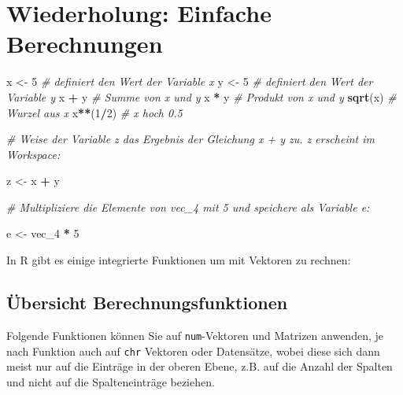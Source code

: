 \documentclass[
  ngerman,
]{book}
\newenvironment{Shaded}{\begin{snugshade}}{\end{snugshade}}
\newcommand{\CommentTok}[1]{\textcolor[rgb]{0.56,0.35,0.01}{\textit{#1}}}
\newcommand{\DecValTok}[1]{\textcolor[rgb]{0.00,0.00,0.81}{#1}}
\newcommand{\FunctionTok}[1]{\textcolor[rgb]{0.13,0.29,0.53}{\textbf{#1}}}
\newcommand{\NormalTok}[1]{#1}
\newcommand{\OtherTok}[1]{\textcolor[rgb]{0.56,0.35,0.01}{#1}}
\newcommand{\SpecialCharTok}[1]{\textcolor[rgb]{0.81,0.36,0.00}{\textbf{#1}}}
\begin{document}
\section{Wiederholung: Einfache Berechnungen}\label{wiederholung-einfache-berechnungen}

\begin{Shaded}
\begin{Highlighting}[]
\NormalTok{x }\OtherTok{\textless{}{-}} \DecValTok{5}     \CommentTok{\# definiert den Wert der Variable x}
\NormalTok{y }\OtherTok{\textless{}{-}} \DecValTok{5}     \CommentTok{\# definiert den Wert der Variable y}
\NormalTok{x }\SpecialCharTok{+}\NormalTok{ y      }\CommentTok{\# Summe von x und y}
\NormalTok{x }\SpecialCharTok{*}\NormalTok{ y      }\CommentTok{\# Produkt von x und y}
\FunctionTok{sqrt}\NormalTok{(x)    }\CommentTok{\# Wurzel aus x}
\NormalTok{x}\SpecialCharTok{**}\NormalTok{(}\DecValTok{1}\SpecialCharTok{/}\DecValTok{2}\NormalTok{)   }\CommentTok{\# x hoch 0.5}

\CommentTok{\# Weise der Variable z das Ergebnis der Gleichung \textasciigrave{}x + y\textasciigrave{} zu. \textasciigrave{}z\textasciigrave{} erscheint im Workspace:}

\NormalTok{z }\OtherTok{\textless{}{-}}\NormalTok{ x }\SpecialCharTok{+}\NormalTok{ y}

\CommentTok{\# Multipliziere die Elemente von vec\_4 mit 5 und speichere als Variable e:}

\NormalTok{e }\OtherTok{\textless{}{-}}\NormalTok{ vec\_4 }\SpecialCharTok{*} \DecValTok{5}
\end{Highlighting}
\end{Shaded}

In R gibt es einige integrierte Funktionen um mit Vektoren zu rechnen:

\subsection{Übersicht Berechnungsfunktionen}\label{uxfcbersicht-berechnungsfunktionen}

Folgende Funktionen können Sie auf \texttt{num}-Vektoren und Matrizen anwenden, je nach Funktion auch auf \texttt{chr} Vektoren oder Datensätze, wobei diese sich dann meist nur auf die Einträge in der oberen Ebene, z.B. auf die Anzahl der Spalten und nicht auf die Spalteneinträge beziehen.
\end{document}
